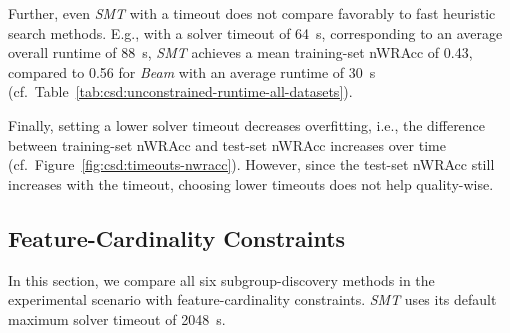 \documentclass{article}
\theoremstyle{definition}
\begin{document}
Further, even \emph{SMT} with a timeout does not compare favorably to fast heuristic search methods.
E.g., with a solver timeout of 64~s, corresponding to an average overall runtime of 88~s, \emph{SMT} achieves a mean training-set nWRAcc of 0.43, compared to 0.56 for \emph{Beam} with an average runtime of 30~s (cf.~Table~\ref{tab:csd:unconstrained-runtime-all-datasets}).

Finally, setting a lower solver timeout decreases overfitting, i.e., the difference between training-set nWRAcc and test-set nWRAcc increases over time (cf.~Figure~\ref{fig:csd:timeouts-nwracc}).
However, since the test-set nWRAcc still increases with the timeout, choosing lower timeouts does not help quality-wise.

\subsection{Feature-Cardinality Constraints}
\label{sec:csd:evaluation:cardinality}

In this section, we compare all six subgroup-discovery methods in the experimental scenario with feature-cardinality constraints.
\emph{SMT} uses its default maximum solver timeout of 2048~s.
\end{document}
